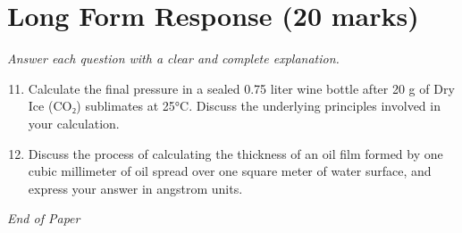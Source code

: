 \documentclass[12pt]{article}
\begin{document}
\section*{Long Form Response (20 marks)}
\textit{Answer each question with a clear and complete explanation.}
\begin{enumerate}[label=\arabic*.]
\setcounter{enumi}{10}
\item Calculate the final pressure in a sealed 0.75 liter wine bottle after 20 g of Dry Ice
(CO₂) sublimates at 25°C. Discuss the underlying principles involved in your calculation.
\item Discuss the process of calculating the thickness of an oil film formed by one cubic
millimeter of oil spread over one square meter of water surface, and express your answer
in angstrom units.
\end{enumerate}

\vfill
\noindent\textit{End of Paper}
\end{document}
